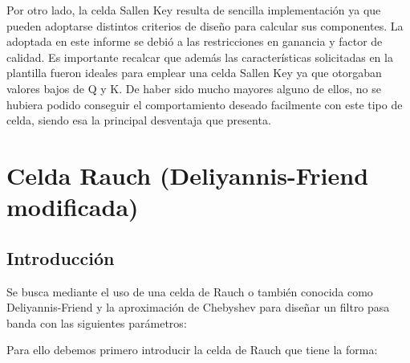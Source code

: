 Por otro lado, la celda Sallen Key resulta de sencilla implementación ya que pueden adoptarse distintos criterios de diseño para calcular sus componentes. La adoptada en este informe se debió a las restricciones en ganancia y factor de calidad. Es importante recalcar que además las características solicitadas en la plantilla fueron ideales para emplear una celda Sallen Key ya que otorgaban valores bajos de Q y K. De haber sido mucho mayores alguno de ellos, no se hubiera podido conseguir el comportamiento deseado facilmente con este tipo de celda, siendo esa la principal desventaja que presenta. 


\section{Celda Rauch (Deliyannis-Friend modificada)}

\subsection{Introducción}

Se busca mediante el uso de una celda de Rauch o también conocida como Deliyannis-Friend y la aproximación de Chebyshev para diseñar un filtro pasa banda con las siguientes parámetros:

\begin{table}[H]
    \centering
    \caption{Par\'ametros de diseño para el filtro a implementar}
    \label{ej22diseno}
\end{table}

Para ello debemos primero introducir la celda de Rauch que tiene la forma:

